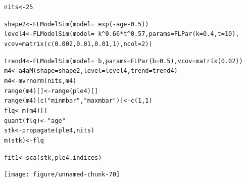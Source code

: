 \documentclass[a4paper,english,10pt]{article}\usepackage[]{graphicx}\usepackage[]{color}
\makeatletter
\newcommand{\hlnum}[1]{\textcolor[rgb]{0.2,0.2,0.2}{#1}}%
\newcommand{\hlstr}[1]{\textcolor[rgb]{0.2,0.2,0.2}{#1}}%
\newcommand{\hlopt}[1]{\textcolor[rgb]{0.2,0.2,0.2}{#1}}%
\newcommand{\hlstd}[1]{\textcolor[rgb]{0,0,0}{#1}}%
\newcommand{\hlkwb}[1]{\textcolor[rgb]{0.361,0.506,0.596}{#1}}%
\newcommand{\hlkwc}[1]{\textcolor[rgb]{0.361,0.506,0.596}{#1}}%
\newcommand{\hlkwd}[1]{\textcolor[rgb]{0.361,0.506,0.596}{#1}}%
\newenvironment{kframe}{%
 \def\at@end@of@kframe{}%
 \ifinner\ifhmode%
  \def\at@end@of@kframe{\end{minipage}}%
  \begin{minipage}{\columnwidth}%
 \fi\fi%
 \def\FrameCommand##1{\hskip\@totalleftmargin \hskip-\fboxsep
 \colorbox{shadecolor}{##1}\hskip-\fboxsep
     \hskip-\linewidth \hskip-\@totalleftmargin \hskip\columnwidth}%
 \MakeFramed {\advance\hsize-\width
   \@totalleftmargin\z@ \linewidth\hsize
   \@setminipage}}%
 {\par\unskip\endMakeFramed%
 \at@end@of@kframe}
\newenvironment{knitrout}{}{} %
\makeatother
\begin{document}
\begin{knitrout}
\color{fgcolor}\begin{kframe}
\begin{alltt}
\hlstd{nits} \hlkwb{<-} \hlnum{25}

\hlstd{shape2} \hlkwb{<-} \hlkwd{FLModelSim}\hlstd{(}\hlkwc{model} \hlstd{=} \hlopt{~}\hlkwd{exp}\hlstd{(}\hlopt{-}\hlstd{age} \hlopt{-} \hlnum{0.5}\hlstd{))}
\hlstd{level4} \hlkwb{<-} \hlkwd{FLModelSim}\hlstd{(}\hlkwc{model} \hlstd{=} \hlopt{~}\hlstd{k}\hlopt{^}\hlnum{0.66} \hlopt{*} \hlstd{t}\hlopt{^}\hlnum{0.57}\hlstd{,} \hlkwc{params} \hlstd{=} \hlkwd{FLPar}\hlstd{(}\hlkwc{k} \hlstd{=} \hlnum{0.4}\hlstd{,} \hlkwc{t} \hlstd{=} \hlnum{10}\hlstd{),}
    \hlkwc{vcov} \hlstd{=} \hlkwd{matrix}\hlstd{(}\hlkwd{c}\hlstd{(}\hlnum{0.002}\hlstd{,} \hlnum{0.01}\hlstd{,} \hlnum{0.01}\hlstd{,} \hlnum{1}\hlstd{),} \hlkwc{ncol} \hlstd{=} \hlnum{2}\hlstd{))}

\hlstd{trend4} \hlkwb{<-} \hlkwd{FLModelSim}\hlstd{(}\hlkwc{model} \hlstd{=} \hlopt{~}\hlstd{b,} \hlkwc{params} \hlstd{=} \hlkwd{FLPar}\hlstd{(}\hlkwc{b} \hlstd{=} \hlnum{0.5}\hlstd{),} \hlkwc{vcov} \hlstd{=} \hlkwd{matrix}\hlstd{(}\hlnum{0.02}\hlstd{))}
\hlstd{m4} \hlkwb{<-} \hlkwd{a4aM}\hlstd{(}\hlkwc{shape} \hlstd{= shape2,} \hlkwc{level} \hlstd{= level4,} \hlkwc{trend} \hlstd{= trend4)}
\hlstd{m4} \hlkwb{<-} \hlkwd{mvrnorm}\hlstd{(nits, m4)}
\hlkwd{range}\hlstd{(m4)[]} \hlkwb{<-} \hlkwd{range}\hlstd{(ple4)[]}
\hlkwd{range}\hlstd{(m4)[}\hlkwd{c}\hlstd{(}\hlstr{"minmbar"}\hlstd{,} \hlstr{"maxmbar"}\hlstd{)]} \hlkwb{<-} \hlkwd{c}\hlstd{(}\hlnum{1}\hlstd{,} \hlnum{1}\hlstd{)}
\hlstd{flq} \hlkwb{<-} \hlkwd{m}\hlstd{(m4)[]}
\hlkwd{quant}\hlstd{(flq)} \hlkwb{<-} \hlstr{"age"}
\hlstd{stk} \hlkwb{<-} \hlkwd{propagate}\hlstd{(ple4, nits)}
\hlkwd{m}\hlstd{(stk)} \hlkwb{<-} \hlstd{flq}

\hlstd{fit1} \hlkwb{<-} \hlkwd{sca}\hlstd{(stk, ple4.indices)}
\end{alltt}


{\ttfamily\noindent\bfseries\color{errorcolor}{\#\# Error: cannot open the connection}}\end{kframe}
\end{knitrout}


\begin{knitrout}
\color{fgcolor}

{\centering \texttt{[image: figure/unnamed-chunk-70]} 

}



\end{knitrout}
\end{document}

